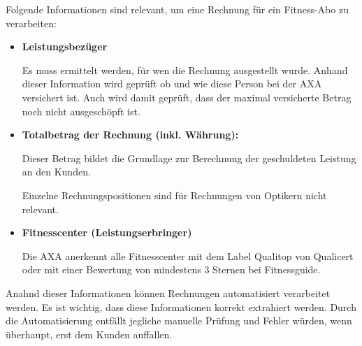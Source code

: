 %    
%    
%    
%    

Folgende Informationen sind relevant, um eine Rechnung für ein Fitness-Abo zu verarbeiten:

\begin{itemize}
    \item \textbf{Leistungsbezüger}
    
    Es muss ermittelt werden, für wen die Rechnung ausgestellt wurde. Anhand dieser Information wird geprüft ob und wie diese Person bei der AXA versichert ist. Auch wird damit geprüft, dass der maximal versicherte Betrag noch nicht ausgeschöpft ist.
    \item \textbf{Totalbetrag der Rechnung (inkl. Währung):}
    
    Dieser Betrag bildet die Grundlage zur Berechnung der geschuldeten Leistung an den Kunden. 
    
    Einzelne Rechnungspositionen sind für Rechnungen von Optikern nicht relevant.
    \item \textbf{Fitnesscenter (Leistungserbringer)}
    
    Die AXA anerkennt alle Fitnesscenter mit dem Label Qualitop von Qualicert oder mit einer Bewertung von mindestens 3 Sternen bei Fitnessguide.
\end{itemize}

Anahnd dieser Informationen können Rechnungen automatisiert verarbeitet werden. Es ist wichtig, dass diese Informationen korrekt extrahiert werden. Durch die Automatisierung entfällt jegliche manuelle Prüfung und Fehler würden, wenn überhaupt, erst dem Kunden auffallen. 

